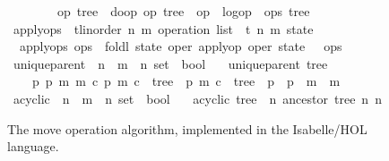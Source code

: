 \documentclass[10pt,journal,compsoc]{IEEEtran}
\renewcommand{\isacartoucheopen}{}
\renewcommand{\isacartoucheclose}{}
\begin{document}
\begin{figure}
\begin{isabellebody}
\ \ \ \ \ \ \ \ {\isacharparenleft}op{}{\isacharcomma}\ tree{}{\isacharparenright}\ {\isacharequal}\ do{\isacharunderscore}op\ {\isacharparenleft}op{}{\isacharcomma}\ tree{}{\isacharparenright}\ \ {\isacharparenleft}op{}\ {\isacharhash}\ logop\ {\isacharhash}\ ops{\isacharcomma}\ tree{}{\isacharparenright}{\isacharparenright}{\isacartoucheclose}\isanewline
\isanewline
{}\isamarkupfalse%
\ apply{\isacharunderscore}ops\ {\isacharcolon}{\isacharcolon}\ {\isacartoucheopen}{\isacharparenleft}{\isacharprime}t{\isacharcolon}{\isacharcolon}{\isacharbraceleft}linorder{\isacharbraceright}{\isacharcomma}\ {\isacharprime}n{\isacharcomma}\ {\isacharprime}m{\isacharparenright}\ operation\ list\ {\isasymRightarrow}\ {\isacharparenleft}{\isacharprime}t{\isacharcomma}\ {\isacharprime}n{\isacharcomma}\ {\isacharprime}m{\isacharparenright}\ state{\isacartoucheclose}\ \isanewline
\ \ {\isacartoucheopen}apply{\isacharunderscore}ops\ ops\ {\isasymequiv}\ foldl\ {\isacharparenleft}{\isasymlambda}state\ oper{\isachardot}\ apply{\isacharunderscore}op\ oper\ state{\isacharparenright}\ {\isacharparenleft}{\isacharbrackleft}{\isacharbrackright}{\isacharcomma}\ {\isacharbraceleft}{\isacharbraceright}{\isacharparenright}\ ops{\isacartoucheclose}\isanewline
\isanewline
{}\isamarkupfalse%
\ unique{\isacharunderscore}parent\ {\isacharcolon}{\isacharcolon}\ {\isacartoucheopen}{\isacharparenleft}{\isacharprime}n\ {\isasymtimes}\ {\isacharprime}m\ {\isasymtimes}\ {\isacharprime}n{\isacharparenright}\ set\ {\isasymRightarrow}\ bool{\isacartoucheclose}\ \isanewline
\ \ {\isacartoucheopen}unique{\isacharunderscore}parent\ tree\ {\isasymequiv}\isanewline
\ \ \ \ {\isacharparenleft}{\isasymforall}p{}\ p{}\ m{}\ m{}\ c{\isachardot}\ {\isacharparenleft}p{}{\isacharcomma}\ m{}{\isacharcomma}\ c{\isacharparenright}\ {\isasymin}\ tree\ {\isasymand}\ {\isacharparenleft}p{}{\isacharcomma}\ m{}{\isacharcomma}\ c{\isacharparenright}\ {\isasymin}\ tree\ {\isasymlongrightarrow}\ p{}\ {\isacharequal}\ p{}\ {\isasymand}\ m{}\ {\isacharequal}\ m{}{\isacharparenright}{\isacartoucheclose}\isanewline%
\isanewline
{}\isamarkupfalse%
\ acyclic\ {\isacharcolon}{\isacharcolon}\ {\isacartoucheopen}{\isacharparenleft}{\isacharprime}n\ {\isasymtimes}\ {\isacharprime}m\ {\isasymtimes}\ {\isacharprime}n{\isacharparenright}\ set\ {\isasymRightarrow}\ bool{\isacartoucheclose}\ \isanewline
\ \ {\isacartoucheopen}acyclic\ tree\ {\isasymequiv}\ {\isacharparenleft}{\isasymnexists}n{\isachardot}\ ancestor\ tree\ n\ n{\isacharparenright}{\isacartoucheclose}
\end{isabellebody}
\caption{The move operation algorithm, implemented in the Isabelle/HOL language.}
\label{fig:code}
\end{figure}
\end{document}

